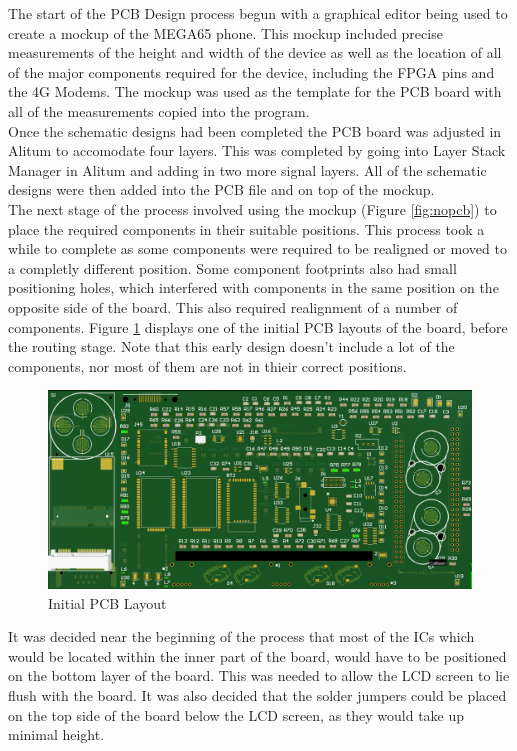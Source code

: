 	The start of the PCB Design process begun with a graphical editor being used to create a mockup of the MEGA65 phone. This mockup included precise measurements of the height and width of the device as well as the location of all of the major components required for the device, including the FPGA pins and the 4G Modems. The mockup was used as the template for the PCB board with all of the measurements copied into the program. \\
	Once the schematic designs had been completed the PCB board was adjusted in Alitum to accomodate four layers. This was completed by going into Layer Stack Manager in Alitum and adding in two more signal layers. All of the schematic designs were then added into the PCB file and on top of the mockup. \\
The next stage of the process involved using the mockup (Figure \ref{fig:nopcb}) to place the required components in their suitable positions. This process took a while to complete as some components were required to be realigned or moved to a completly different position. Some component footprints also had small positioning holes, which interfered with components in the same position on the opposite side of the board. This also required realignment of a number of components. Figure \ref{fig:Initial_PCB} displays one of the initial PCB layouts of the board, before the routing stage. Note that this early design doesn't include a lot of the components, nor most of them are not in thieir correct positions.\\

\begin{figure}
	\includegraphics[width=\linewidth]{Figures/PCB.png}
	\caption{Initial PCB Layout}
	\label{fig:Initial_PCB}
\end{figure}

	It was decided near the beginning of the process that most of the ICs which would be located within the inner part of the board, would have to be positioned on the bottom layer of the board. This was needed to allow the LCD screen to lie flush with the board. It was also decided that the solder jumpers could be placed on the top side of the board below the LCD screen, as they would take up minimal height.\\

